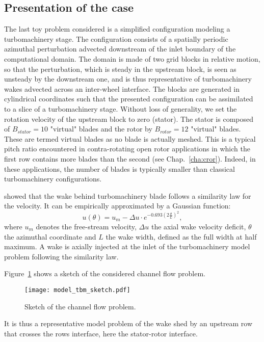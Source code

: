 
\subsection{Presentation of the case}

The last toy problem considered is a simplified 
configuration modeling a turbomachinery 
stage. The configuration consists of a spatially 
periodic azimuthal perturbation advected downstream 
of the inlet boundary of the computational domain. 
The domain is made of two grid blocks in relative 
motion, so that the perturbation, which is steady 
in the upstream block, is seen as unsteady by the 
downstream one, and is thus representative of 
turbomachinery wakes advected across an inter-wheel interface.
The blocks are generated in cylindrical
coordinates such that the presented configuration
can be assimilated to a slice of 
a turbomachinery stage.
Without loss of generality, 
we set the rotation velocity of the upstream block to zero (stator). 
The stator is composed of $B_{stator} = 10$
"virtual" blades and the rotor by $B_{rotor} = 12$ "virtual" blades.
These are termed virtual blades as no blade is actually meshed.
This is a typical pitch ratio encountered 
in contra-rotating open rotor applications in which 
the first row contains more blades 
than the second (see Chap.~\ref{cha:cror}). Indeed, in
these applications, the number
of blades is typically smaller than classical
turbomachinery configurations.

\citet{Lakshminarayana1980} showed that the wake
behind turbomachinery blade follows a similarity law for the velocity. 
It can be empirically approximated by a Gaussian function:
\begin{equation}
    u (\theta) = u_m - 
        \Delta u \cdot e^{
          -0.693 \left( 2 \frac{\theta}{L} \right) ^ 2},
    \label{eq:similarity}
\end{equation}
where $u_m$ denotes the free-stream velocity, $\Delta u$ the axial wake velocity deficit,
$\theta$ the azimuthal coordinate and $L$ the wake width,
defined as the full width at half maximum.
A wake is axially injected at the inlet of the
turbomachinery model problem following the \citet{Lakshminarayana1980}
similarity law.

Figure~\ref{fig:model_tbm_sketch} shows a sketch
of the considered channel flow problem.
\begin{figure}[htb]
  \centering
  \texttt{[image: model\_tbm\_sketch.pdf]}
  \caption{Sketch of the channel flow problem.}
  \label{fig:model_tbm_sketch}
\end{figure}
It is thus a representative model problem of the wake shed
by an upstream row that crosses the rows interface, 
here the stator-rotor interface.

